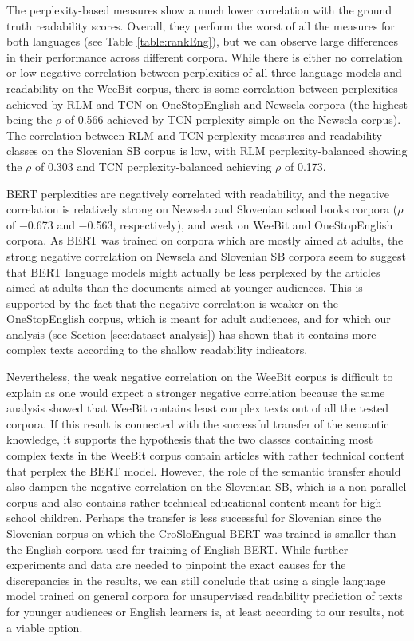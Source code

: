 \documentclass{clv3}
\begin{document}
The perplexity-based measures show a much lower correlation with the ground truth readability scores. Overall, they perform the worst of all the measures for both languages (see Table \ref{table:rankEng}), but we can observe large differences in their performance across different corpora. While there is either no correlation or low negative correlation between perplexities of all three language models and readability on the WeeBit corpus, there is some correlation between perplexities achieved by RLM and TCN on OneStopEnglish and Newsela corpora (the highest being the $\rho$ of 0.566 achieved by TCN perplexity-simple on the Newsela corpus). The correlation between RLM and TCN perplexity measures and readability classes on the Slovenian SB corpus is low, with RLM perplexity-balanced showing the $\rho$ of 0.303 and TCN perplexity-balanced achieving $\rho$ of 0.173.  

BERT perplexities are negatively correlated with readability, and the negative correlation is relatively strong on Newsela and Slovenian school books corpora ($\rho$ of \num{-0.673} and \num{-0.563}, respectively), and weak on WeeBit and OneStopEnglish corpora. As BERT was trained on corpora which are mostly aimed at adults, the strong negative correlation on Newsela and Slovenian SB corpora seem to suggest that BERT language models might actually be less perplexed by the articles aimed at adults than the documents aimed at younger audiences. This is supported by the fact that the negative correlation is weaker on the OneStopEnglish corpus, which is meant for adult audiences, and for which our analysis (see Section \ref{sec:dataset-analysis}) has shown that it contains more complex texts according to the shallow readability indicators. 

Nevertheless, the weak negative correlation on the WeeBit corpus is difficult to explain as one would expect a stronger negative correlation because the same analysis showed that WeeBit contains least complex texts out of all the tested corpora. If this result is connected with the successful transfer of the semantic knowledge, it supports the hypothesis that the two classes containing most complex texts in the WeeBit corpus contain articles with rather technical content that perplex the BERT model. However, the role of the semantic transfer should also dampen the negative correlation on the Slovenian SB, which is a non-parallel corpus and also contains rather technical educational content meant for high-school children. Perhaps the transfer is less successful for Slovenian since the Slovenian corpus on which the CroSloEngual BERT was trained is smaller than the English corpora used for training of English BERT. While further experiments and data are needed to pinpoint the exact causes for the discrepancies in the results, we can still conclude that using a single language model trained on general corpora for unsupervised readability prediction of texts for younger audiences or English learners is, at least according to our results, not a viable option.
\end{document}
